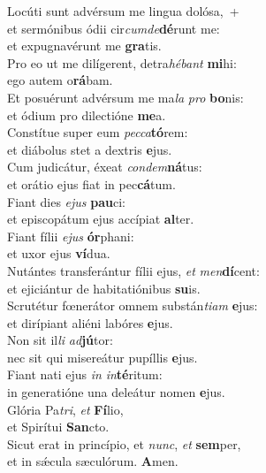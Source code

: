 \evenverse Locúti sunt advérsum me lingua dolósa,~+\\\evenverse  et sermónibus ódii cir\textit{cum}\textit{de}\textbf{dé}runt me:~\*\\
\evenverse et expugnavérunt me \textbf{gra}tis.\\
\oddverse Pro eo ut me dilígerent, detra\textit{hé}\textit{bant} \textbf{mi}hi:~\*\\
\oddverse ego autem o\textbf{rá}bam.\\
\evenverse Et posuérunt advérsum me ma\textit{la} \textit{pro} \textbf{bo}nis:~\*\\
\evenverse et ódium pro dilectióne \textbf{me}a.\\
\oddverse Constítue super eum \textit{pec}\textit{ca}\textbf{tó}rem:~\*\\
\oddverse et diábolus stet a dextris \textbf{e}jus.\\
\evenverse Cum judicátur, éxeat \textit{con}\textit{dem}\textbf{ná}tus:~\*\\
\evenverse et orátio ejus fiat in pec\textbf{cá}tum.\\
\oddverse Fiant dies \textit{e}\textit{jus} \textbf{pau}ci:~\*\\
\oddverse et episcopátum ejus accípiat \textbf{al}ter.\\
\evenverse Fiant fílii \textit{e}\textit{jus} \textbf{ór}phani:~\*\\
\evenverse et uxor ejus \textbf{ví}dua.\\
\oddverse Nutántes transferántur fílii ejus, \textit{et} \textit{men}\textbf{dí}cent:~\*\\
\oddverse et ejiciántur de habitatiónibus \textbf{su}is.\\
\evenverse Scrutétur fœnerátor omnem substán\textit{ti}\textit{am} \textbf{e}jus:~\*\\
\evenverse et dirípiant aliéni labóres \textbf{e}jus.\\
\oddverse Non sit il\textit{li} \textit{ad}\textbf{jú}tor:~\*\\
\oddverse nec sit qui misereátur pupíllis \textbf{e}jus.\\
\evenverse Fiant nati ejus \textit{in} \textit{in}\textbf{té}ritum:~\*\\
\evenverse in generatióne una deleátur nomen \textbf{e}jus.\\
\oddverse Glória Pa\textit{tri}, \textit{et} \textbf{Fí}lio,~\*\\
\oddverse et Spirítui \textbf{San}cto.\\
\evenverse Sicut erat in princípio, et \textit{nunc}, \textit{et} \textbf{sem}per,~\*\\
\evenverse et in sǽcula sæculórum. \textbf{A}men.\\

